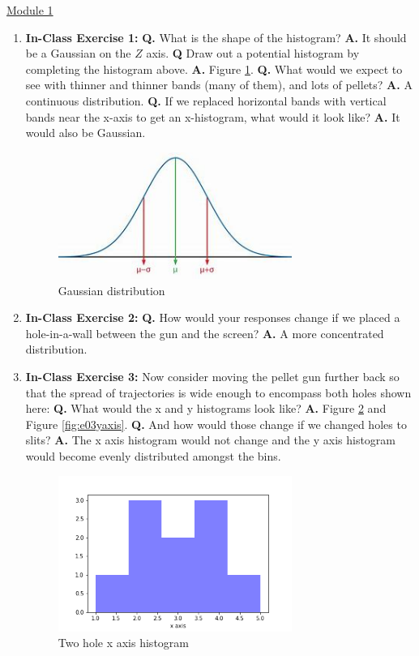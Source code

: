 \documentclass[main.tex]{subfiles}
\begin{document}
\href{https://www2.seas.gwu.edu/~simhaweb/quantum/modules/module1/module1.html}{Module 1}

\begin{enumerate}

\item[] \textbf{In-Class Exercise 1:} \textbf{Q.} What is the shape of the histogram? \textbf{A.} It should be a Gaussian on the $Z$ axis. \textbf{Q} Draw out a potential histogram by completing the histogram above. \textbf{A.} Figure \ref{fig:e01Gaussian}. \textbf{Q.} What would we expect to see with thinner and thinner bands (many of them), and lots of pellets? \textbf{A.} A continuous distribution. \textbf{Q.} If we replaced horizontal bands with vertical bands near the x-axis to get an x-histogram, what would it look like? \textbf{A.} It would also be Gaussian.

\begin{figure}
  \centering
  \includegraphics[width=3in]{modules/figs/m01/e01gaussian.jpeg}
  \caption{Gaussian distribution}
  \label{fig:e01Gaussian}
\end{figure}

\item[] \textbf{In-Class Exercise 2:} \textbf{Q.} How would your responses change if we placed a hole-in-a-wall between the gun and the screen? \textbf{A.} A more concentrated distribution.

\item[] \textbf{In-Class Exercise 3:}  Now consider moving the pellet gun further back so that the spread of trajectories is wide enough to encompass both holes shown here: \textbf{Q.} What would the x and y histograms look like? \textbf{A.} Figure \ref{fig:e03xaxis} and Figure \ref{fig:e03yaxis}. \textbf{Q.} And how would those change if we changed holes to slits? \textbf{A.} The x axis histogram would not change and the y axis histogram would become evenly distributed amongst the bins.

\begin{figure}
  \centering
  \includegraphics[width=3in]{modules/figs/m01/e03xaxis.png}
  \caption{Two hole x axis histogram}
  \label{fig:e03xaxis}
\end{figure}


\end{enumerate}
\end{document}
